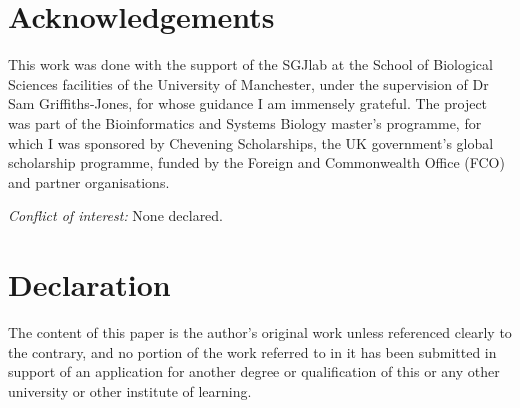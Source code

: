 \documentclass[nocrop]{bioinfo}
\begin{document}
\section{Acknowledgements}
This work was done with the support of the SGJlab at the School of Biological Sciences facilities of the University of Manchester, under the supervision of Dr Sam Griffiths-Jones, for whose guidance I am immensely grateful. The project was part of the Bioinformatics and Systems Biology master's programme, for which I was sponsored by Chevening Scholarships, the UK government's global scholarship programme, funded by the Foreign and Commonwealth Office (FCO) and partner organisations.

\textit{Conflict of interest:} None declared.

\section{Declaration}
The content of this paper is the author's original work unless referenced clearly to the contrary, and no portion of the work referred to in it has been submitted in support of an application for another degree or qualification of this or any other university or other institute of learning.
\end{document}
